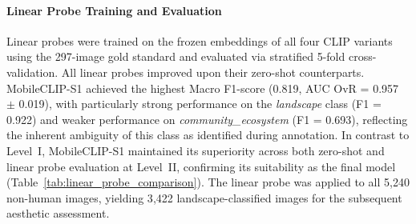 \documentclass[hidelinks, 11pt]{article}
\begin{document}
\paragraph{Linear Probe Training and Evaluation}

Linear probes were trained on the frozen embeddings of all four CLIP variants using the 297-image gold standard and evaluated via stratified 5-fold cross-validation. All linear probes improved upon their zero-shot counterparts. MobileCLIP-S1 achieved the highest Macro F1-score (0.819, AUC OvR = 0.957 $\pm$ 0.019), with particularly strong performance on the \textit{landscape} class (F1 = 0.922) and weaker performance on \textit{community\_ecosystem} (F1 = 0.693), reflecting the inherent ambiguity of this class as identified during annotation. In contrast to Level~I, MobileCLIP-S1 maintained its superiority across both zero-shot and linear probe 
evaluation at Level~II, confirming its suitability as the final model (Table~\ref{tab:linear_probe_comparison}). The linear probe was applied to all 5{,}240 non-human images, yielding 3{,}422 landscape-classified images for the subsequent aesthetic assessment.


\end{document}
